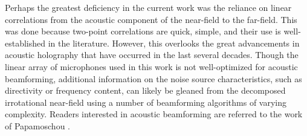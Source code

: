 Perhaps the greatest deficiency in the current work was the reliance on linear correlations from the acoustic component of the near-field to the far-field.
This was done because two-point correlations are quick, simple, and their use is well-established in the literature.
However, this overlooks the great advancements in acoustic holography that have occurred in the last several decades.
Though the linear array of microphones used in this work is not well-optimized for acoustic beamforming, additional information on the noise source characteristics, such as directivity or frequency content, can likely be gleaned from the decomposed irrotational near-field using a number of beamforming algorithms of varying complexity.
Readers interested in acoustic beamforming are referred to the work of Papamoschou \citep{Papamoschou2011}.